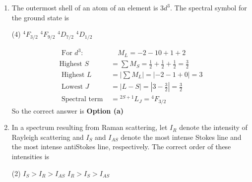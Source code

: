 \begin{enumerate}
\begin{answer}
\begin{align*}
	L^{\prime}&=L(x, y, \dot{x}, \dot{y})+x \ddot{y}-y \ddot{x} \\
	\frac{d^{\prime}}{d t^{\prime}}\left(\frac{\partial L^{\prime}}{\partial \dot{x}}\right)-\frac{\partial L^{\prime}}{\partial x}&=\frac{d}{d t}\left(\frac{\partial L}{\partial \dot{x}}\right)-\frac{\partial L}{\partial x}+\ddot{y}=0=0+\ddot{y}=0 \Rightarrow \dot{y}=c_{1} \\
	\frac{d}{d t}\left(\frac{\partial L}{\partial y}\right)-\frac{\partial L^{\prime}}{\partial y}&=\frac{d}{d t}\left(\frac{\partial L}{\partial \dot{y}}\right)-\frac{\partial L}{\partial y}+\ddot{x}=0=0-\ddot{x}=0 \Rightarrow \dot{x}=c_{2}
	\end{align*}
	So the correct answer is \textbf{Option (b)}
\end{answer}
(check question)	
\section{PART C}
\item The outermost shell of an atom of an element is $3 d^{3}$. The spectral symbol for the ground state is
 \begin{tasks}(4)
	\task[\textbf{a.}] ${ }^{4} F_{3 / 2}$
	\task[\textbf{b.}]${ }^{4} F_{9 / 2}$
	\task[\textbf{c.}]${ }^{4} D_{7 / 2}$
	\task[\textbf{d.}] ${ }^{4} D_{1 / 2}$
\end{tasks}
\begin{answer}
	\begin{align*}
	\text { For } d^{3}: &\quad M_{L}=-2-10+1+2\\
	\text{Highest }S&=\sum M_{S}=\frac{1}{2}+\frac{1}{2}+\frac{1}{2}=\frac{3}{2}\\
\text{	Highest }L&=\left|\sum M_{L}\right|=|-2-1+0|=3\\
\text{	Lowest }J&=|L-S|=\left|3-\frac{3}{2}\right|=\frac{3}{2}\\
\text{	Spectral term }&={ }^{2 S+1} L_{J}={ }^{4} F_{3 / 2}
	\end{align*}
		So the correct answer is \textbf{Option (a)}
\end{answer}
\item In a spectrum resulting from Raman scattering, let $I_{R}$ denote the intensity of Rayleigh scattering and $I_{S}$ and $I_{A S}$ denote the most intense Stokes line and the most intense antiStokes line, respectively. The correct order of these intensities is
 \begin{tasks}(2)
	\task[\textbf{a.}] $I_{S}>I_{R}>I_{A S}$
	\task[\textbf{b.}]$I_{R}>I_{S}>I_{A S}$

\end{tasks}
\end{enumerate}
